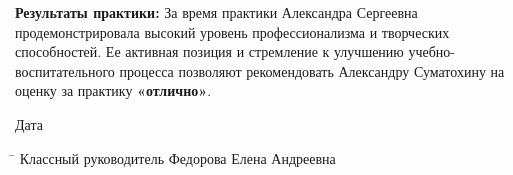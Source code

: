 \documentclass[a4paper,12pt]{article}
\begin{document}
\vspace{5mm}

\textbf{Результаты практики:} За время практики Александра Сергеевна продемонстрировала высокий уровень профессионализма и творческих способностей. Ее активная позиция и стремление к улучшению учебно-воспитательного процесса позволяют рекомендовать Александру Суматохину на оценку за практику \textbf{«отлично»}.

\vspace{10mm}

\noindent
Дата \underline{\hspace{5cm}}
\begin{tabbing}
\hspace{5cm} \= \kill
Классный руководитель \> \underline{\hspace{5cm}} Федорова Елена Андреевна
\end{tabbing}

\vspace{5mm}
\end{document}
